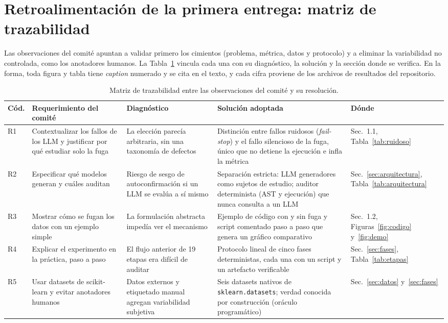 \section{Retroalimentación de la primera entrega: matriz de trazabilidad}
\label{sec:retro}

Las observaciones del comité apuntan a validar primero los cimientos (problema, métrica, datos y protocolo) y a eliminar la variabilidad no controlada, como los anotadores humanos. La Tabla~\ref{tab:retro} vincula cada una con su diagnóstico, la solución y la sección donde se verifica. En la forma, toda figura y tabla tiene \emph{caption} numerado y se cita en el texto, y cada cifra proviene de los archivos de resultados del repositorio.

\begin{table}[!htbp]
\centering
\caption{Matriz de trazabilidad entre las observaciones del comité y su resolución.}
\label{tab:retro}
\begingroup\scriptsize\singlespacing
\begin{tabular}{@{}l p{3.3cm} p{3.6cm} p{5.6cm} p{1.9cm}@{}}
\toprule
Cód. & Requerimiento del comité & Diagnóstico & Solución adoptada & Dónde \\
\midrule
R1 & Contextualizar los fallos de los LLM y justificar por qué estudiar solo la fuga & La elección parecía arbitraria, sin una taxonomía de defectos & Distinción entre fallos ruidosos (\emph{fail-stop}) y el fallo silencioso de la fuga, único que no detiene la ejecución e infla la métrica & Sec.~1.1, Tabla~\ref{tab:ruidoso} \\
R2 & Especificar qué modelos generan y cuáles auditan & Riesgo de sesgo de autoconfirmación si un LLM se evalúa a sí mismo & Separación estricta: LLM generadores como sujetos de estudio; auditor determinista (AST y ejecución) que nunca consulta a un LLM & Sec.~\ref{sec:arquitectura}, Tabla~\ref{tab:arquitectura} \\
R3 & Mostrar cómo se fugan los datos con un ejemplo simple & La formulación abstracta impedía ver el mecanismo & Ejemplo de código con y sin fuga y script comentado paso a paso que genera un gráfico comparativo & Sec.~1.2, Figuras~\ref{fig:codigo} y~\ref{fig:demo} \\
R4 & Explicar el experimento en la práctica, paso a paso & El flujo anterior de 19 etapas era difícil de auditar & Protocolo lineal de cinco fases deterministas, cada una con un script y un artefacto verificable & Sec.~\ref{sec:fases}, Tabla~\ref{tab:etapas} \\
R5 & Usar datasets de scikit-learn y evitar anotadores humanos & Datos externos y etiquetado manual agregan variabilidad subjetiva & Seis datasets nativos de \texttt{sklearn.datasets}; verdad conocida por construcción (oráculo programático) & Sec.~\ref{sec:datos} y~\ref{sec:fases} \\

\end{tabular}
\end{table}
